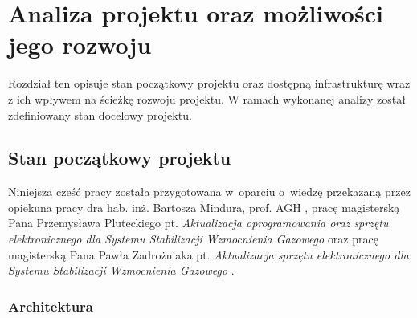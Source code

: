 
\chapter{Analiza projektu oraz możliwości jego rozwoju}

Rozdział ten opisuje stan początkowy projektu oraz dostępną infrastrukturę wraz z ich wpływem na ścieżkę rozwoju projektu. W ramach wykonanej analizy został zdefiniowany stan docelowy projektu.

\section{Stan początkowy projektu}
\label{cha:pocz}

Niniejsza cześć pracy została przygotowana w~oparciu o~wiedzę przekazaną przez opiekuna pracy dra hab. inż. Bartosza Mindura, prof. AGH \cite{Jinst}, pracę magisterską Pana Przemysława Pluteckiego pt. \textit{Aktualizacja oprogramowania oraz sprzętu elektronicznego dla Systemu Stabilizacji Wzmocnienia Gazowego} \cite{PluteckiMgr} oraz pracę magisterską Pana Pawła Zadrożniaka pt. \textit{Aktualizacja sprzętu elektronicznego dla Systemu Stabilizacji Wzmocnienia Gazowego} \cite{ZadrozniakMgr}.

\subsection{Architektura}


